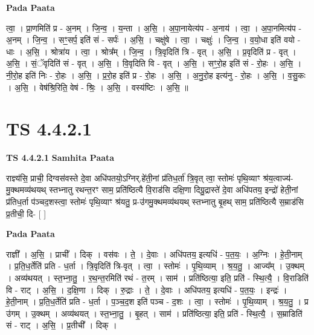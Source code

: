 \documentclass[17pt]{extarticle}
\begin{document}
\textbf{Pada Paata} \newline

त्वा॒ । प्रा॒णमिति॑ प्र - अ॒नम् । जि॒न्व॒ । य॒न्ता । अ॒सि॒ । अ॒पा॒नायेत्य॑प - अ॒नाय॑ । त्वा॒ । अ॒पा॒नमित्य॑प - अ॒नम् । जि॒न्व॒ । सꣳ॒॒सर्प॒ इति॑ सं - सर्पः॑ । अ॒सि॒ । चक्षु॑षे । त्वा॒ । चक्षुः॑ । जि॒न्व॒ । व॒यो॒धा इति॑ वयो - धाः । अ॒सि॒ । श्रोत्रा॑य । त्वा॒ । श्रोत्र᳚म् । जि॒न्व॒ । त्रि॒वृदिति॑ त्रि - वृत् । अ॒सि॒ । प्र॒वृदिति॑ प्र - वृत् । अ॒सि॒ । सं॒ॅवृदिति॑ सं - वृत् । अ॒सि॒ । वि॒वृदिति वि - वृत् । अ॒सि॒ । सꣳ॒॒रो॒ह इति॑ सं - रो॒हः । अ॒सि॒ । नी॒रो॒ह इति॑ निः - रो॒हः । अ॒सि॒ । प्र॒रो॒ह इति॑ प्र - रो॒हः । अ॒सि॒ । अ॒नु॒रो॒ह इत्य॑नु - रो॒हः । अ॒सि॒ । व॒सु॒कः । अ॒सि॒ । वेष॑श्रि॒रिति॒ वेष॑ - श्रिः॒ । अ॒सि॒ । वस्य॑ष्टिः । अ॒सि॒ ॥  \newline





\section{ TS 4.4.2.1 }

\textbf{TS 4.4.2.1 } \newline
\textbf{Samhita Paata} \newline

राज्ञ्य॑सि॒ प्राची॒ दिग्वस॑वस्ते दे॒वा अधि॑पतयो॒ऽग्निर्.हे॑ती॒नां प्र॑तिध॒र्ता॑ त्रि॒वृत् त्वा॒ स्तोमः॑ पृथि॒व्याꣳ श्र॑य॒त्वाज्य॑-मु॒क्थमव्य॑थयथ् स्तभ्नातु रथन्त॒रꣳ साम॒ प्रति॑ष्ठित्यै वि॒राड॑सि दक्षि॒णा दिग्रु॒द्रास्ते॑ दे॒वा अधि॑पतय॒ इन्द्रो॑ हेती॒नां प्र॑तिध॒र्ता प॑ञ्चद॒शस्त्वा॒ स्तोमः॑ पृथि॒व्याꣳ श्र॑यतु॒ प्र-उ॑गमु॒क्थमव्य॑थयथ् स्तभ्नातु बृ॒हथ् साम॒ प्रति॑ष्ठित्यै स॒म्राड॑सि प्र॒तीची॒ दि- [  ] \newline

\textbf{Pada Paata} \newline

राज्ञी᳚ । अ॒सि॒ । प्राची᳚ । दिक् । वस॑वः । ते॒ । दे॒वाः । अधि॑पतय॒ इत्यधि॑ - प॒त॒यः॒ । अ॒ग्निः । हे॒ती॒नाम् । प्र॒ति॒ध॒र्तेति॑ प्रति - ध॒र्ता । त्रि॒वृदिति॑ त्रि-वृत् । त्वा॒ । स्तोमः॑ । पृ॒थि॒व्याम् । श्र॒य॒तु॒ । आज्य᳚म् । उ॒क्थम् । अव्य॑थयत् । स्त॒भ्ना॒तु॒ । र॒थ॒न्त॒रमिति॑ रथं - त॒रम् । साम॑ । प्रति॑ष्ठित्या॒ इति॒ प्रति॑ - स्थि॒त्यै॒ । वि॒राडिति॑ वि - राट् । अ॒सि॒ । द॒क्षि॒णा । दिक् । रु॒द्राः । ते॒ । दे॒वाः । अधि॑पतय॒ इत्यधि॑ - प॒त॒यः॒ । इन्द्रः॑ । हे॒ती॒नाम् । प्र॒ति॒ध॒र्तेति॑ प्रति - ध॒र्ता । प॒ञ्च॒द॒श इति॑ पञ्च - द॒शः । त्वा॒ । स्तोमः॑ । पृ॒थि॒व्याम् । श्र॒य॒तु॒ । प्र उ॑गम् । उ॒क्थम् । अव्य॑थयत् । स्त॒भ्ना॒तु॒ । बृ॒हत् । साम॑ । प्रति॑ष्ठित्या॒ इति॒ प्रति॑ - स्थि॒त्यै॒ । स॒म्राडिति॑ सं - राट् । अ॒सि॒ । प्र॒तीची᳚ । दिक् ।  \newline
\end{document}
